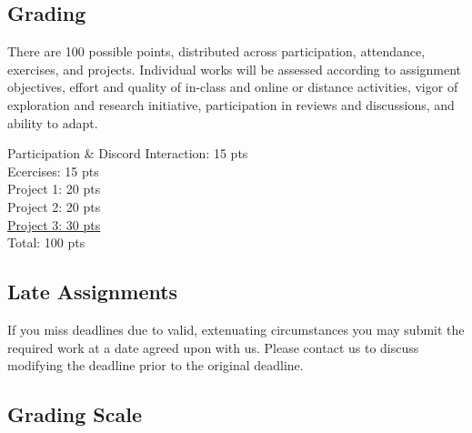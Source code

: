 \documentclass[12pt,letter,english]{report}
\begin{document}
\subsection{Grading}

There are 100 possible points, distributed across participation, attendance, exercises, and projects. Individual works will be assessed according to assignment objectives, effort and quality of in-class and online or distance activities, vigor of exploration and research initiative, participation in reviews and discussions, and ability to adapt.

\hspace*{1em} Participation \& Discord Interaction: 15 pts\\
\hspace*{1em} Ecercises: 15 pts\\
\hspace*{1em} Project 1: 20 pts\\
\hspace*{1em} Project 2: 20 pts\\
\hspace*{1em} \ul{Project 3: 30 pts}\\
\hspace*{1em} Total: 100 pts

\subsection{Late Assignments}

If you miss deadlines due to valid, extenuating circumstances you may submit the required work at a date agreed upon with us. Please contact us to discuss modifying the deadline prior to the original deadline.

\subsection{Grading Scale}
\end{document}
